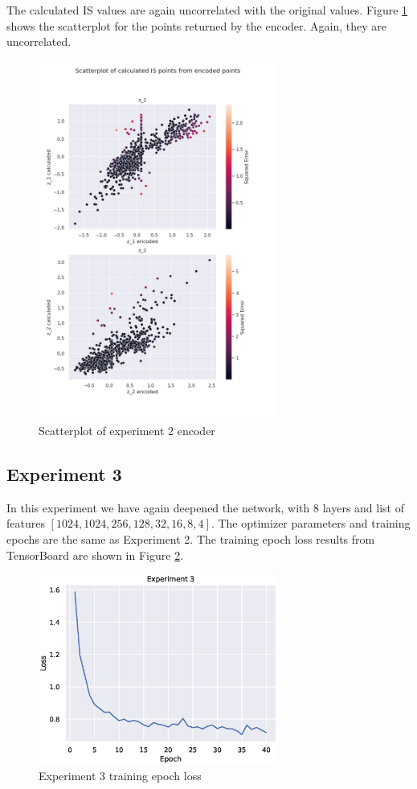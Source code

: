The calculated IS values are again uncorrelated with the original values. Figure \ref{fig:scatter_enc_exp2} shows the scatterplot for the points returned by the encoder. Again, they are uncorrelated.

\begin{figure}[H]
    \centering
    \includegraphics[width=0.7\textwidth]{Cap5/scatterplot_enc2}
    \caption{Scatterplot of experiment 2 encoder}
    \label{fig:scatter_enc_exp2}
\end{figure}

\subsection{Experiment 3}

In this experiment we have again deepened the network, with 8 layers and list of features $[1024, 1024, 256, 128, 32, 16, 8, 4]$. The optimizer parameters and training epochs are the same as Experiment 2. The training epoch loss results from TensorBoard are shown in Figure \ref{fig:exp3}.

\begin{figure}[H]
    \centering
    \includegraphics[width=0.7\textwidth]{Cap5/loss_exp3}
    \caption{Experiment 3 training epoch loss}
    \label{fig:exp3}
\end{figure}

